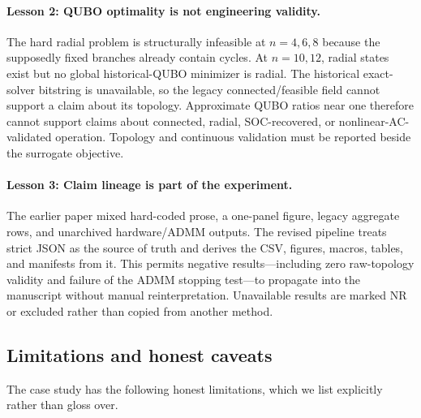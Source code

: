 \documentclass[5p,twocolumn,number,sort&compress,nopreprintline]{elsarticle}
\begin{document}
\paragraph{Lesson 2: QUBO optimality is not engineering validity.}
The hard radial problem is structurally infeasible at $n=4,6,8$
because the supposedly fixed branches already contain cycles. At
$n=10,12$, radial states exist but no global historical-QUBO minimizer
is radial. The historical exact-solver bitstring is unavailable, so
the legacy connected/feasible field cannot support a claim about its
topology. Approximate QUBO ratios near one therefore cannot support
claims about connected, radial, SOC-recovered, or nonlinear-AC-validated
operation. Topology and continuous validation must be reported beside the
surrogate objective.

\paragraph{Lesson 3: Claim lineage is part of the experiment.}
The earlier paper mixed hard-coded prose, a one-panel figure, legacy
aggregate rows, and unarchived hardware/ADMM outputs. The revised
pipeline treats strict JSON as the source of truth and derives the CSV,
figures, macros, tables, and manifests from it. This permits negative
results---including zero raw-topology validity and failure of the ADMM
stopping test---to propagate into the manuscript without manual
reinterpretation. Unavailable results are marked NR or excluded rather
than copied from another method.

\subsection{Limitations and honest caveats}
The case study has the following honest limitations, which we list
explicitly rather than gloss over.
\end{document}
